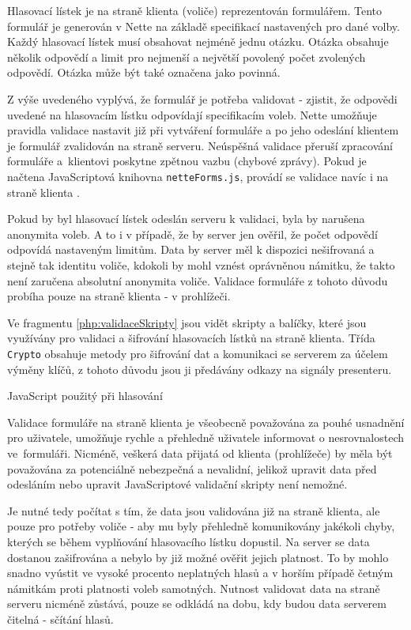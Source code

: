 Hlasovací lístek je na straně klienta (voliče) reprezentován formulářem. Tento formulář je generován v Nette na základě specifikací nastavených pro dané volby. Každý hlasovací lístek musí obsahovat nejméně jednu otázku. Otázka obsahuje několik odpovědí a limit pro nejmenší a největší povolený počet zvolených odpovědí. Otázka může být také označena jako povinná.

Z výše uvedeného vyplývá, že formulář je potřeba validovat - zjistit, že odpovědi uvedené na hlasovacím lístku odpovídají specifikacím voleb. Nette umožňuje pravidla validace nastavit již při vytváření formuláře a po jeho odeslání klientem je formulář zvalidován na straně serveru. Neúspěšná validace přeruší zpracování formuláře a~klientovi poskytne zpětnou vazbu (chybové zprávy). Pokud je načtena JavaScriptová knihovna \texttt{netteForms.js}, provádí se validace navíc i na straně klienta \cite{NetteForms}.

Pokud by byl hlasovací lístek odeslán serveru k validaci, byla by narušena anonymita voleb. A to i v případě, že by server jen ověřil, že počet odpovědí odpovídá nastaveným limitům. Data by server měl k dispozici nešifrovaná a stejně tak identitu voliče, kdokoli by mohl vznést oprávněnou námitku, že takto není zaručena absolutní anonymita voliče. Validace formuláře z tohoto důvodu probíha pouze na straně klienta - v prohlížeči.

Ve fragmentu \ref{php:validaceSkripty} jsou vidět skripty a balíčky, které jsou využívány pro validaci a šifrování hlasovacích lístků na straně klienta. Třída \texttt{Crypto} obsahuje metody pro šifrování dat a komunikaci se serverem za účelem výměny klíčů, z tohoto důvodu jsou ji předávány odkazy na signály presenteru.

\begin{listing}[ht]
\caption{JavaScript použitý při hlasování}
\label{php:validaceSkripty}
\end{listing}

\clearpage
{}\label{section:hlasovaniValidace}
Validace formuláře na straně klienta je všeobecně považována za pouhé usnadnění pro uživatele, umožňuje rychle a přehledně uživatele informovat o nesrovnalostech ve~formuláři. Nicméně, veškerá data přijatá od klienta (prohlížeče) by měla být považována za potenciálně nebezpečná a nevalidní, jelikož upravit data před odesláním nebo upravit JavaScriptové validační skripty není nemožné. \cite{Validace1}\cite{Validace2}\cite{Validace3}

Je nutné tedy počítat s tím, že data jsou validována již na straně klienta, ale pouze pro potřeby voliče - aby mu byly přehledně komunikovány jakékoli chyby, kterých se během vyplňování hlasovacího lístku dopustil. Na server se data dostanou zašifrována a nebylo by již možné ověřit jejich platnost. To by mohlo snadno vyústit ve vysoké procento neplatných hlasů a v horším případě četným námitkám proti platnosti voleb samotných. Nutnost validovat data na straně serveru nicméně zůstává, pouze se odkládá na dobu, kdy budou data serverem čitelná - sčítání hlasů.

